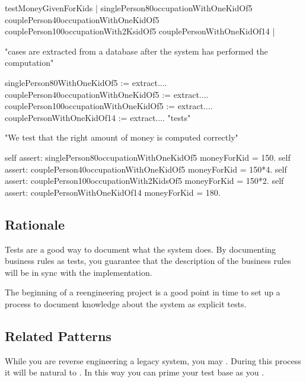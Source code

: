 \documentclass[a4paper,10pt,twoside]{book}
\begin{document}
\begin{code}
testMoneyGivenForKids
	|	singlePerson80occupationWithOneKidOf5
		couplePerson40occupationWithOneKidOf5
		couplePerson100occupationWith2KsidOf5
		couplePersonWithOneKidOf14 |

"cases are extracted from a database after the system has
performed the computation"

singlePerson80WithOneKidOf5 := extract....
couplePerson40occupationWithOneKidOf5 := extract....
couplePerson100occupationWithOneKidOf5 := extract....
couplePersonWithOneKidOf14 := extract....
"tests"

"We test that the right amount of money is computed correctly"

self assert: singlePerson80occupationWithOneKidOf5 moneyForKid = 150.
self assert: couplePerson40occupationWithOneKidOf5 moneyForKid = 150*4.
self assert: couplePerson100occupationWith2KidsOf5 moneyForKid = 150*2.
self assert: couplePersonWithOneKidOf14 moneyForKid = 180.
\end{code}

\subsection*{Rationale}

Tests are a good way to document what the system does. By documenting business rules as tests, you guarantee that the description of the business rules will be in sync with the implementation. 

The beginning of a reengineering project is a good point in time to set up a process to document knowledge about the system as explicit tests.

\subsection*{Related Patterns}

While you are reverse engineering a legacy system, you may . During this process it will be natural to . In this way you can prime your test base as you .


\end{document}
